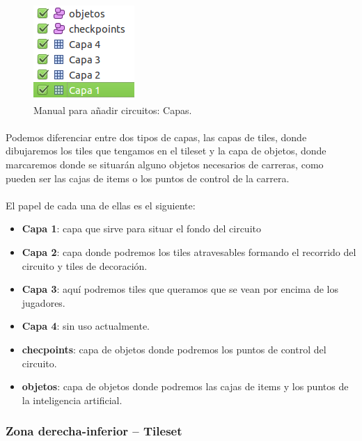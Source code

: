 \begin{figure}[H]
  \label{capas}
  \begin{center}
    \includegraphics[scale=1]{imagenes/manualcircuito/capas.png}
  \end{center}
  \caption{Manual para añadir circuitos: Capas.}
\end{figure}

\paragraph{}
Podemos diferenciar entre dos tipos de capas, las capas de tiles, donde dibujaremos los tiles que tengamos en el tileset y la 
capa de objetos, donde marcaremos donde se situarán alguno objetos necesarios de carreras, como pueden ser las cajas de items
o los puntos de control de la carrera.

\paragraph{}
El papel de cada una de ellas es el siguiente:

\begin{itemize}
    \item \textbf{Capa 1}: capa que sirve para situar el fondo del circuito
    \item \textbf{Capa 2}: capa donde podremos los tiles atravesables formando el recorrido del circuito y tiles de decoración.
    \item \textbf{Capa 3}: aquí podremos tiles que queramos que se vean por encima de los jugadores.
    \item \textbf{Capa 4}: sin uso actualmente.
    \item \textbf{checpoints}: capa de objetos donde podremos los puntos de control del circuito.
    \item \textbf{objetos}: capa de objetos donde podremos las cajas de items y los puntos de la inteligencia artificial.
\end{itemize}

\subsubsection{Zona derecha-inferior -- Tileset}

